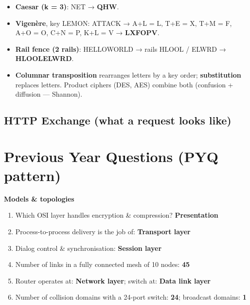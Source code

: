 \begin{itemize}
\tightlist
\item
  \textbf{Caesar (k = 3)}: NET → \textbf{QHW}.
\item
  \textbf{Vigenère}, key LEMON: ATTACK → A+L = L, T+E = X, T+M = F, A+O = O, C+N = P, K+L = V → \textbf{LXFOPV}.
\item
  \textbf{Rail fence (2 rails)}: HELLOWORLD → rails HLOOL / ELWRD → \textbf{HLOOLELWRD}.
\item
  \textbf{Columnar transposition} rearranges letters by a key order; \textbf{substitution} replaces letters. Product ciphers (DES, AES) combine both (confusion + diffusion --- Shannon).
\end{itemize}

\needspace{95pt}

\hypertarget{p2-09--149-http-exchange-what-a-request-looks-like}{%
\subsection{HTTP Exchange (what a request looks like)}\label{p2-09--149-http-exchange-what-a-request-looks-like}}



\needspace{125pt}

\hypertarget{p2-09--previous-year-questions-pyq-pattern}{%
\section{Previous Year Questions (PYQ pattern)}\label{p2-09--previous-year-questions-pyq-pattern}}

\textbf{Models \& topologies}

\begin{enumerate}
\def\labelenumi{\arabic{enumi}.}
\tightlist
\item
  Which OSI layer handles encryption \& compression? \textbf{Presentation}
\item
  Process-to-process delivery is the job of: \textbf{Transport layer}
\item
  Dialog control \& synchronisation: \textbf{Session layer}
\item
  Number of links in a fully connected mesh of 10 nodes: \textbf{45}
\item
  Router operates at: \textbf{Network layer}; switch at: \textbf{Data link layer}
\item
  Number of collision domains with a 24-port switch: \textbf{24}; broadcast domains: \textbf{1}
\end{enumerate}

